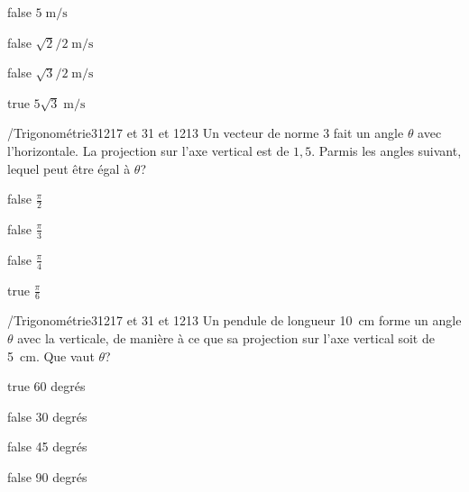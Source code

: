             \begin{reponses}
                \item[false] $5\;\si{\meter\per\second}$
                \item[false] $\sqrt{2}/2\;\si{\meter\per\second}$
                \item[false] $\sqrt{3}/2\;\si{\meter\per\second}$
                \item[true] $5\sqrt{3}\;\si{\meter\per\second}$
            \end{reponses}
        	\begin{question}{/}{Trigonométrie}{3}{1217 et 31 et 1213}
				Un vecteur de norme $3$ fait un angle $\theta$ avec l'horizontale. La projection sur l'axe vertical est de $1,5$. Parmis les angles suivant, lequel peut être égal à $\theta$?
            \end{question}
            \begin{reponses}
            	\item[false] $\frac{\pi}{2}$
            	\item[false] $\frac{\pi}{3}$
                \item[false] $\frac{\pi}{4}$
                \item[true] $\frac{\pi}{6}$
            \end{reponses}
            \begin{question}{/}{Trigonométrie}{3}{1217 et 31 et 1213}
                Un pendule de longueur \SI{10}{\centi\meter} forme un angle $\theta$ avec la verticale, de manière à ce que sa projection sur l'axe vertical soit de \SI{5}{\centi\meter}. Que vaut $\theta$?
            \end{question}
            \begin{reponses}
                \item[true] 60 degrés
                \item[false] 30 degrés
                \item[false] 45 degrés
                \item[false] 90 degrés
            \end{reponses}
